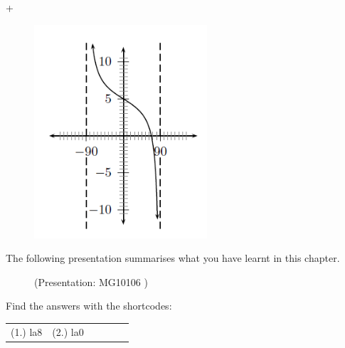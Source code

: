 \begin{enumerate}[noitemsep, label=\textbf{\arabic*}. ]
\begin{figure}[H]
\begin{center}
\vspace{2pt}
\vspace{.1in}
\end{center}
\end{figure}       +
\setcounter{subfigure}{0}
\begin{figure}[H] %
\begin{center}
\label{m39414*id92174!!!underscore!!!media}\label{m39414*id92174!!!underscore!!!printimage}\includegraphics[height=300px]{col11306.imgs/m39414_trigrep6.png} %
\vspace{2pt}
\vspace{.1in}
\end{center}
\end{figure}               \end{enumerate}
\label{m39414*eip-749}The following presentation summarises what you have learnt in this chapter.
\setcounter{subfigure}{0}
\begin{figure}[H] %
\label{m39414*slidesharemedia}\label{m39414*slideshareflash} { (Presentation:  MG10106 )}
\vspace{2pt}
\vspace{.1in}
\end{figure}       \par 
\label{m39414*eip-300}
\par {} Find the answers with the shortcodes:
\par \begin{tabular}[h]{cccccc}
(1.) la8  &  (2.) la0  & \end{tabular}
